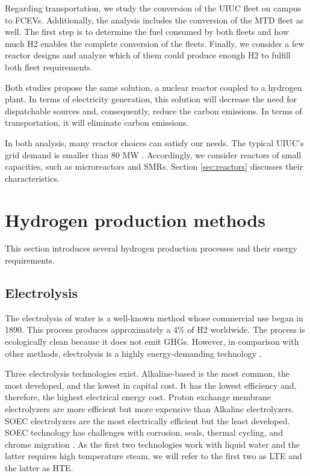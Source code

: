 \documentclass[11pt,letterpaper]{article}
\begin{document}
Regarding transportation, we study the conversion of the \gls{UIUC} fleet on campus to \glspl{FCEV}.
Additionally, the analysis includes the conversion of the \gls{MTD} fleet as well.
The first step is to determine the fuel consumed by both fleets and how much \gls{H2} enables the complete conversion of the fleets.
Finally, we consider a few reactor designs and analyze which of them could produce enough \gls{H2} to fulfill both fleet requirements.

Both studies propose the same solution, a nuclear reactor coupled to a hydrogen plant.
In terms of electricity generation, this solution will decrease the need for dispatchable sources and, consequently, reduce the carbon emissions.
In terms of transportation, it will eliminate carbon emissions.

In both analysis, many reactor choices can satisfy our needs.
The typical \gls{UIUC}'s grid demand is smaller than 80 MW \cite{dotson_optimal_2020}.
Accordingly, we consider reactors of small capacities, such as microreactors and \glspl{SMR}.
Section \ref{sec:reactors} discusses their characteristics.

\section{Hydrogen production methods}
\label{sec:hydro}

This section introduces several hydrogen production processes and their energy requirements.

\subsection{Electrolysis}

The electrolysis of water is a well-known method whose commercial use began in 1890.
This process produces approximately a 4\% of \gls{H2} worldwide.
The process is ecologically clean because it does not emit \glspl{GHG}.
However, in comparison with other methods, electrolysis is a highly energy-demanding technology \cite{kalamaras_hydrogen_2013}.

Three electrolysis technologies exist.
Alkaline-based is the most common, the most developed, and the lowest in capital cost.
It has the lowest efficiency and, therefore, the highest electrical energy cost.
Proton exchange membrane electrolyzers are more efficient but more expensive than Alkaline electrolyzers.
\gls{SOEC} electrolyzers are the most electrically efficient but the least developed.
\gls{SOEC} technology has challenges with corrosion, seals, thermal cycling, and chrome migration \cite{kalamaras_hydrogen_2013}.
As the first two technologies work with liquid water and the latter requires high temperature steam, we will refer to the first two as \gls{LTE} and the latter as \gls{HTE}.
\end{document}
